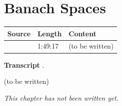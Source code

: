 \chapter{Banach Spaces}\label{ch:c22}
\begin{paracol}{2}

\begin{sources}
\begin{tabularx}{\linewidth}{@{}l l L@{}}
\toprule
\textbf{Source} & \textbf{Length} & \textbf{Content}\\
\midrule
{} & 1:49:17 & (to be written)\\
\bottomrule
\end{tabularx}

\smallskip
\textbf{Transcript} .
\end{sources}

\begin{reading}
(to be written)
\end{reading}

\emph{This chapter has not been written yet.}

\flushside
\end{paracol}
